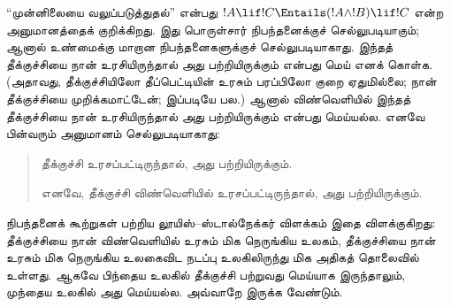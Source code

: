\documentclass[../../../include/open-logic-section]{subfiles}
\begin{document}


``முன்னிலையை வலுப்படுத்துதல்'' என்பது $!A \lif !C \Entails (!A
\land !B) \lif !C$ என்ற அனுமானத்தைக் குறிக்கிறது. இது பொருள்சார்
நிபந்தனைக்குச் செல்லுபடியாகும்; ஆனால் உண்மைக்கு மாறான நிபந்தனைகளுக்குச்
செல்லுபடியாகாது. இந்தத் தீக்குச்சியை நான் உரசியிருந்தால் அது பற்றியிருக்கும்
என்பது மெய் எனக் கொள்க. (அதாவது, தீக்குச்சியிலோ தீப்பெட்டியின் உரசும்
பரப்பிலோ குறை ஏதுமில்லை; நான் தீக்குச்சியை முறிக்கமாட்டேன்; இப்படியே
பல.) ஆனால் விண்வெளியில் இந்தத் தீக்குச்சியை நான் உரசியிருந்தால் அது
பற்றியிருக்கும் என்பது மெய்யல்ல. எனவே பின்வரும் அனுமானம் செல்லுபடியாகாது:
\begin{quote}
  தீக்குச்சி உரசப்பட்டிருந்தால், அது பற்றியிருக்கும்.

  எனவே, தீக்குச்சி விண்வெளியில் உரசப்பட்டிருந்தால், அது பற்றியிருக்கும்.
\end{quote}

நிபந்தனைக் கூற்றுகள் பற்றிய லூயிஸ்--ஸ்டால்நேக்கர் விளக்கம் இதை
விளக்குகிறது: தீக்குச்சியை நான் விண்வெளியில் உரசும் மிக நெருங்கிய உலகம்,
தீக்குச்சியை நான் உரசும் மிக நெருங்கிய உலகைவிட நடப்பு உலகிலிருந்து மிக
அதிகத் தொலைவில் உள்ளது. ஆகவே பிந்தைய உலகில் தீக்குச்சி பற்றுவது மெய்யாக
இருந்தாலும், முந்தைய உலகில் அது மெய்யல்ல. அவ்வாறே இருக்க வேண்டும்.
\end{document}

